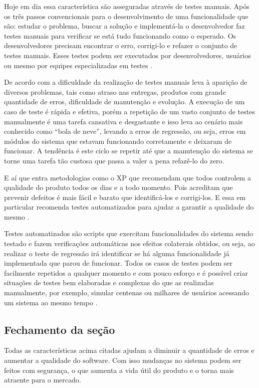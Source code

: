 Hoje em dia essa característica são asseguradas através de testes manuais. Após os três passos convencionais para o desenvolvimento de uma funcionalidade que são: estudar o problema, buscar a solução e implementá-la o desenvolvedor faz testes manuais para verificar se está tudo funcionando como o esperado. Os desenvolvedores precisam encontrar o erro, corrigi-lo e refazer o conjunto de testes manuais. Esses testes podem ser executados por desenvolvedores, usuários ou mesmo por equipes especializadas em testes \cite{kon}.

De acordo com \cite{kon} a dificuldade da realização de testes manuais leva à aparição de diversos problemas, tais como atraso nas entregas, produtos com grande quantidade de erros, dificuldade de manutenção e evolução. A execução de um caso de teste é rápida e efetiva, porém a repetição de um vasto conjunto de testes manualmente é uma tarefa cansativa e desgastante e isso leva ao cenário mais conhecido como “bola de neve”, levando a erros de regressão, ou seja, erros em módulos do sistema que estavam funcionando corretamente e deixaram de funcionar. A tendência é este ciclo se repetir até que a manutenção do sistema se torne uma tarefa tão custosa que passa a valer a pena refazê-lo do zero.

E aí que entra metodologias como o XP que recomendam que todos controlem a qualidade do produto todos os dias e a todo momento. Pois acreditam que prevenir defeitos é mais fácil e barato que identificá-los e corrigi-los. E essa em particular recomenda testes automatizados para ajudar a garantir a qualidade do mesmo \cite{kon}.

Testes automatizados são scripts que exercitam funcionalidades do sistema sendo testado e fazem verificações automáticas nos efeitos colaterais obtidos, ou seja, ao realizar o teste de regressão irá identificar se há alguma funcionalidade já implementada que parou de funcionar. Todos os casos de testes podem ser facilmente repetidos a qualquer momento e com pouco esforço e é possível criar situações de testes bem elaboradas e complexas do que as realizadas manualmente, por exemplo, simular centenas ou milhares de usuários acessando um sistema ao mesmo tempo \cite{kon}.

\subsection{Fechamento da seção}

Todas as características acima citadas ajudam a diminuir a quantidade de erros e aumentar a qualidade do software. Com isso mudanças no sistema podem ser feitos com segurança, o que aumenta a vida útil do produto e o torna mais atraente para o mercado.
